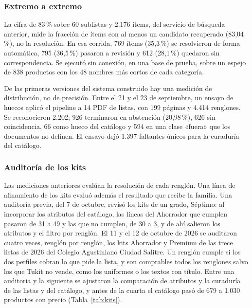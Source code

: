 \subsubsection{Extremo a extremo}

La cifra de 83\,\% sobre 60 sublistas y 2.176 ítems, del servicio de búsqueda anterior, mide la
fracción de ítems con al menos un candidato recuperado (83,04\,\%), no la resolución. En esa
corrida, 769 ítems (35,3\,\%) se resolvieron de forma automática, 795 (36,5\,\%) pasaron a revisión
y 612 (28,1\,\%) quedaron sin correspondencia. Se ejecutó sin conexión, en una base de prueba, sobre
un espejo de 838 productos con los 48 nombres más cortos de cada categoría.

De las primeras versiones del sistema construido hay una medición de distribución, no de precisión. Entre el 21 y el 23 de
septiembre, un ensayo de huecos aplicó el pipeline a 14 PDF de listas, con 199 páginas y 4.414
renglones. Se reconocieron 2.202; 926 terminaron en abstención (20,98\,\%), 626 sin coincidencia,
66 como hueco del catálogo y 594 en una clase «fuera» que los documentos no definen. El ensayo dejó
1.397 faltantes únicos para la curaduría del catálogo.

\subsubsection{Auditoría de los kits}

Las mediciones anteriores evalúan la resolución de cada renglón. Una línea de afinamiento de los
kits evaluó además el resultado que recibe la familia. Una auditoría previa, del 7 de octubre,
revisó los kits de un grado, Séptimo: al incorporar los atributos del catálogo, las líneas del
Ahorrador que cumplen pasaron de 31 a 49 y las que no cumplen, de 30 a 3, y de ahí salieron los
atributos y el filtro por renglón. El 11 y el 12 de octubre de 2026 se auditaron cuatro veces, renglón por renglón, los kits
Ahorrador y Premium de las trece listas de 2026 del Colegio Agustiniano Ciudad Salitre. Un renglón
cumple si los dos perfiles cobran lo que pide la lista, y son comprables todos los renglones salvo
los que Tukit no vende, como los uniformes o los textos con título. Entre una auditoría y la
siguiente se ajustaron la comparación de atributos y la curaduría de las listas y del catálogo, y
antes de la cuarta el catálogo pasó de 679 a 1.030 productos con precio (Tabla~\ref{tab:kits}).




